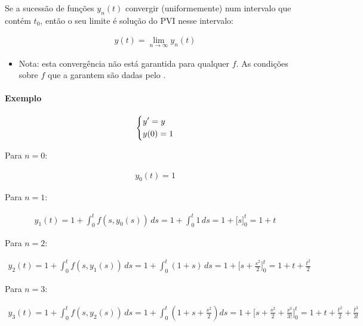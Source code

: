 \documentclass{article}
\begin{document}
Se a sucessão de funções $y_n(t)$ convergir (uniformemente) num intervalo que contém $t_0$,
então o seu limite é solução do PVI nesse intervalo:

\begin{gather*}
\boxed{y(t) = \lim_{n \to \infty} y_n(t)}
\end{gather*}

\begin{itemize}
    \item Nota: esta convergência não está garantida para qualquer $f$.
    As condições sobre $f$ que a garantem são dadas pelo
    .
\end{itemize}

\paragraph{Exemplo}

\begin{gather*}
\begin{dcases}
y' = y \\
y(0) = 1
\end{dcases}
\end{gather*}

Para $n = 0$:

\begin{gather*}
y_0(t) = 1
\end{gather*}

Para $n = 1$:

\begin{gather*}
y_1(t) = 1 + \int_{0}^{t} f(s, y_0(s)) \, ds = 1 + \int_{0}^{t} 1 \, ds = 1 + \Big[ s \Big]_{0}^{t} = 1 + t
\end{gather*}

Para $n = 2$:

\begin{gather*}
y_2(t) = 1 + \int_{0}^{t} f(s, y_1(s)) \, ds = 1 + \int_{0}^{t} (1 + s) \, ds
= 1 + \Big[ s + \frac{s^2}{2} \Big]_{0}^{t} = 1 + t + \frac{t^2}{2}
\end{gather*}

Para $n = 3$:

\begin{gather*}
y_3(t) = 1 + \int_{0}^{t} f(s, y_2(s)) \, ds = 1 + \int_{0}^{t} \left( 1 + s + \frac{s^2}{2} \right) ds
= 1 + \Big[ s + \frac{s^2}{2} + \frac{s^3}{3!} \Big]_{0}^{t} = 1 + t + \frac{t^2}{2} + \frac{t^3}{3!}
\end{gather*}
\end{document}
